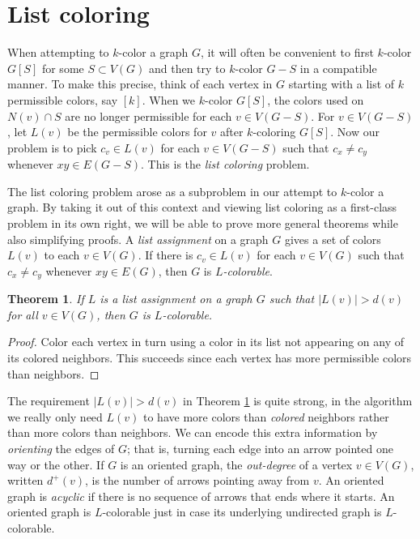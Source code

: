 \documentclass[openany]{tufte-book} %
\theoremstyle{plain}
\newtheorem{theorem}{Theorem}
\newcommand{\card}[1]{\left|#1\right|}
\newcommand{\irange}[1]{\left[#1\right]}
\begin{document}
\section{List coloring}
When attempting to $k$-color a graph $G$, it will often be convenient to first $k$-color $G[S]$ for some $S \subset V(G)$ and then try to 
$k$-color $G-S$ in a compatible manner. To make this precise, think of each vertex in $G$ starting with a list of $k$ permissible colors, say $\irange{k}$.
When we $k$-color $G[S]$, the colors used on $N(v) \cap S$ are no longer permissible for each $v \in V(G-S)$.  For $v \in V(G-S)$, let $L(v)$ be the permissible colors
for $v$ after $k$-coloring $G[S]$.  Now our problem is to pick $c_v \in L(v)$ for each $v \in V(G-S)$ such that $c_x \ne c_y$ whenever $xy \in E(G-S)$.  This is the
\emph{list coloring} problem.

The list coloring problem arose as a subproblem in our attempt to $k$-color a graph.  By taking it out of this context and viewing list coloring as a first-class problem in its own
right, we will be able to prove more general theorems while also simplifying proofs.  A \emph{list assignment} on a graph $G$ gives a set of colors $L(v)$ to each $v \in V(G)$.  
If there is $c_v \in L(v)$ for each $v \in V(G)$ such that $c_x \ne c_y$ whenever $xy \in E(G)$, then $G$ is \emph{$L$-colorable}.

\begin{theorem}\label{FirstListBound}
If $L$ is a list assignment on a graph $G$ such that $\card{L(v)} > d(v)$ for all $v \in V(G)$, then $G$ is $L$-colorable.
\end{theorem}
\begin{proof}
Color each vertex in turn using a color in its list not appearing on any of its colored neighbors.  
This succeeds since each vertex has more permissible colors than neighbors.
\end{proof}

The requirement $\card{L(v)} > d(v)$ in Theorem \ref{FirstListBound} is quite strong, in the algorithm we really only need $L(v)$ to have more colors 
than \emph{colored} neighbors rather than more colors than neighbors.  We can encode this extra information by \emph{orienting} the edges of $G$; that is, turning
each edge into an arrow pointed one way or the other.  If $G$ is an oriented graph, the \emph{out-degree} of a vertex $v \in V(G)$, written $d^+(v)$, is the number of arrows
pointing away from $v$.  An oriented graph is \emph{acyclic} if there is no sequence of arrows that ends where it starts.  An oriented graph is $L$-colorable just in case its
underlying undirected graph is $L$-colorable.
\end{document}
